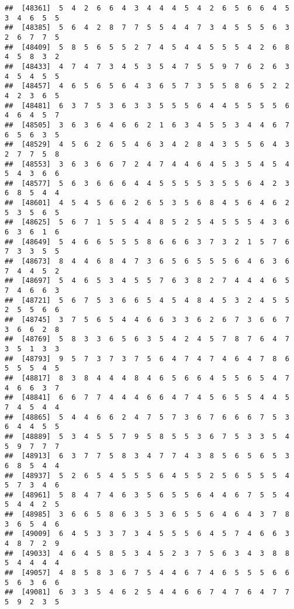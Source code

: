 \documentclass[
]{book}
\begin{document}
\begin{verbatim}
##  [48361]  5  4  2  6  6  4  3  4  4  4  5  4  2  6  5  6  6  4  5  3  4  6  5  5
##  [48385]  5  6  4  2  8  7  7  5  5  4  4  7  3  4  5  5  5  6  3  2  6  7  7  5
##  [48409]  5  8  5  6  5  5  2  7  4  5  4  4  5  5  5  4  2  6  8  4  5  8  3  2
##  [48433]  4  7  4  7  3  4  5  3  5  4  7  5  5  9  7  6  2  6  3  4  5  4  5  5
##  [48457]  4  6  5  6  5  6  4  3  6  5  7  3  5  5  8  6  5  2  2  4  2  3  6  5
##  [48481]  6  3  7  5  3  6  3  3  5  5  5  6  4  4  5  5  5  5  6  4  6  4  5  7
##  [48505]  3  6  3  6  4  6  6  2  1  6  3  4  5  5  3  4  4  6  7  6  5  6  3  5
##  [48529]  4  5  6  2  6  5  4  6  3  4  2  8  4  3  5  5  6  4  3  2  7  7  5  8
##  [48553]  3  6  3  6  6  7  2  4  7  4  4  6  4  5  3  5  4  5  4  5  4  3  6  6
##  [48577]  5  6  3  6  6  6  4  4  5  5  5  5  3  5  5  6  4  2  3  6  8  5  4  4
##  [48601]  4  5  4  5  6  6  2  6  5  3  5  6  8  4  5  6  4  6  2  5  3  5  6  5
##  [48625]  5  6  7  1  5  5  4  4  8  5  2  5  4  5  5  5  4  3  6  6  3  6  1  6
##  [48649]  5  4  6  6  5  5  5  8  6  6  6  3  7  3  2  1  5  7  6  7  3  3  5  5
##  [48673]  8  4  4  6  8  4  7  3  6  5  6  5  5  5  6  4  6  3  6  7  4  4  5  2
##  [48697]  5  4  6  5  3  4  5  5  7  6  3  8  2  7  4  4  4  6  5  7  4  6  6  3
##  [48721]  5  6  7  5  3  6  6  5  4  5  4  8  4  5  3  2  4  5  5  2  5  5  6  6
##  [48745]  3  7  5  6  5  4  4  6  6  3  3  6  2  6  7  3  6  6  7  3  6  6  2  8
##  [48769]  5  8  3  3  6  5  6  3  5  4  2  4  5  7  8  7  6  4  7  3  5  1  3  3
##  [48793]  9  5  7  3  7  3  7  5  6  4  7  4  7  4  6  4  7  8  6  5  5  5  4  5
##  [48817]  8  3  8  4  4  4  8  4  6  5  6  6  4  5  5  6  5  4  7  4  6  6  3  7
##  [48841]  6  6  7  7  4  4  4  6  6  4  7  4  5  6  5  5  4  4  5  7  4  5  4  4
##  [48865]  5  4  4  6  6  2  4  7  5  7  3  6  7  6  6  6  7  5  3  6  4  4  5  5
##  [48889]  5  3  4  5  5  7  9  5  8  5  5  3  6  7  5  3  3  5  4  5  9  7  7  7
##  [48913]  6  3  7  7  5  8  3  4  7  7  4  3  8  5  6  5  6  5  3  6  8  5  4  4
##  [48937]  5  2  6  5  4  5  5  5  6  4  5  5  2  5  6  5  5  5  4  5  7  3  4  6
##  [48961]  5  8  4  7  4  6  3  5  6  5  5  6  4  4  6  7  5  5  4  5  4  4  2  5
##  [48985]  3  6  6  5  8  6  3  5  3  6  5  5  6  4  6  4  3  7  8  3  6  5  4  6
##  [49009]  6  4  5  3  3  7  3  4  5  5  5  6  4  5  7  4  6  6  3  4  8  7  2  9
##  [49033]  4  6  4  5  8  5  3  4  5  2  3  7  5  6  3  4  3  8  8  5  4  4  4  4
##  [49057]  4  8  5  8  3  6  7  5  4  4  6  7  4  6  5  5  5  6  6  5  6  3  6  6
##  [49081]  6  3  3  5  4  6  2  5  4  4  6  6  7  4  7  6  4  7  7  5  9  2  3  5

\end{verbatim}
\end{document}
